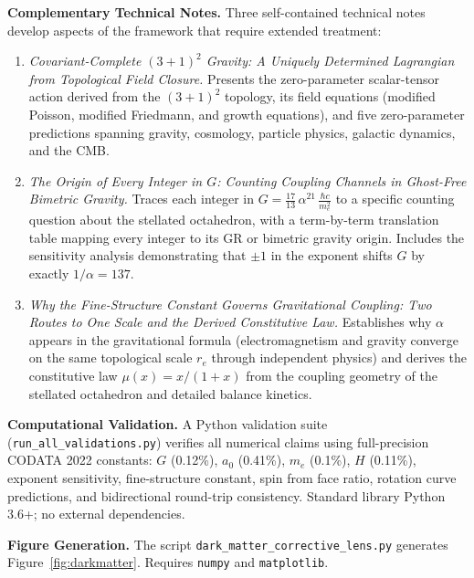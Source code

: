 \documentclass[aps,prd,preprint,superscriptaddress,showpacs,preprintnumbers,amsmath,amssymb,nofootinbib]{revtex4-2}
\begin{document}
\textbf{Complementary Technical Notes.}\quad
Three self-contained technical notes develop aspects of the framework that require extended treatment:
\begin{enumerate}[leftmargin=2em]
\item \textit{Covariant-Complete $(3+1)^2$ Gravity: A Uniquely Determined Lagrangian from Topological Field Closure.} Presents the zero-parameter scalar-tensor action derived from the $(3+1)^2$ topology, its field equations (modified Poisson, modified Friedmann, and growth equations), and five zero-parameter predictions spanning gravity, cosmology, particle physics, galactic dynamics, and the CMB.

\item \textit{The Origin of Every Integer in $G$: Counting Coupling Channels in Ghost-Free Bimetric Gravity.} Traces each integer in $G = \frac{17}{13}\,\alpha^{21}\,\frac{\hbar c}{m_e^2}$ to a specific counting question about the stellated octahedron, with a term-by-term translation table mapping every integer to its GR or bimetric gravity origin. Includes the sensitivity analysis demonstrating that $\pm 1$ in the exponent shifts $G$ by exactly $1/\alpha = 137$.

\item \textit{Why the Fine-Structure Constant Governs Gravitational Coupling: Two Routes to One Scale and the Derived Constitutive Law.} Establishes why $\alpha$ appears in the gravitational formula (electromagnetism and gravity converge on the same topological scale $r_e$ through independent physics) and derives the constitutive law $\mu(x) = x/(1+x)$ from the coupling geometry of the stellated octahedron and detailed balance kinetics.
\end{enumerate}

\textbf{Computational Validation.}\quad
A Python validation suite (\texttt{run\_all\_validations.py}) verifies all numerical claims using full-precision CODATA 2022 constants: $G$ (0.12\%), $a_0$ (0.41\%), $m_e$ (0.1\%), $H$ (0.11\%), exponent sensitivity, fine-structure constant, spin from face ratio, rotation curve predictions, and bidirectional round-trip consistency. Standard library Python 3.6+; no external dependencies.

\textbf{Figure Generation.}\quad
The script \texttt{dark\_matter\_corrective\_lens.py} generates Figure~\ref{fig:darkmatter}. Requires \texttt{numpy} and \texttt{matplotlib}.
\end{document}
